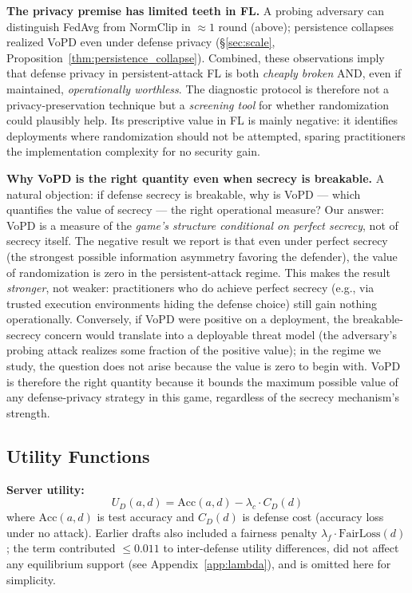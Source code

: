 \documentclass{article}
\newcommand{\UD}{U_D}
\begin{document}
\textbf{The privacy premise has limited teeth in FL.} A probing adversary can distinguish FedAvg from NormClip in ${\approx}1$ round (above); persistence collapses realized VoPD even under defense privacy (§\ref{sec:scale}, Proposition~\ref{thm:persistence_collapse}). Combined, these observations imply that defense privacy in persistent-attack FL is both \emph{cheaply broken} AND, even if maintained, \emph{operationally worthless}. The diagnostic protocol is therefore not a privacy-preservation technique but a \emph{screening tool} for whether randomization could plausibly help. Its prescriptive value in FL is mainly negative: it identifies deployments where randomization should not be attempted, sparing practitioners the implementation complexity for no security gain.

\textbf{Why VoPD is the right quantity even when secrecy is breakable.} A natural objection: if defense secrecy is breakable, why is VoPD --- which quantifies the value of secrecy --- the right operational measure? Our answer: VoPD is a measure of the \emph{game's structure conditional on perfect secrecy}, not of secrecy itself. The negative result we report is that even under perfect secrecy (the strongest possible information asymmetry favoring the defender), the value of randomization is zero in the persistent-attack regime. This makes the result \emph{stronger}, not weaker: practitioners who do achieve perfect secrecy (e.g., via trusted execution environments hiding the defense choice) still gain nothing operationally. Conversely, if VoPD were positive on a deployment, the breakable-secrecy concern would translate into a deployable threat model (the adversary's probing attack realizes some fraction of the positive value); in the regime we study, the question does not arise because the value is zero to begin with. VoPD is therefore the right quantity because it bounds the maximum possible value of any defense-privacy strategy in this game, regardless of the secrecy mechanism's strength.

\subsection{Utility Functions}

\textbf{Server utility:}
\begin{equation}
    \UD(a, d) = \text{Acc}(a, d) - \lambda_c \cdot C_D(d)
    \label{eq:server_utility}
\end{equation}
where $\text{Acc}(a, d)$ is test accuracy and $C_D(d)$ is defense cost (accuracy loss under no attack). Earlier drafts also included a fairness penalty $\lambda_f \cdot \text{FairLoss}(d)$; the term contributed ${\leq}0.011$ to inter-defense utility differences, did not affect any equilibrium support (see Appendix~\ref{app:lambda}), and is omitted here for simplicity.
\end{document}
